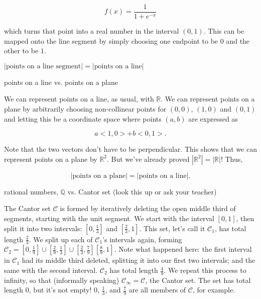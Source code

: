 \documentclass[../key.tex]{subfiles}
\begin{document}
$$f(x)=\frac{1}{1+e^{-x}}$$

\noindent which turns that point into a real number in the interval $(0,1)$. This can be mapped onto the line segment by simply choosing one endpoint to be $0$ and the other to be $1$.

$|\text{points on a line segment}| = |\text{points on a line}|$

\begin{inner_problem}
\item points on a line vs. points on a plane
\end{inner_problem}

\noindent We can represent points on a line, as usual, with $\mathbb{R}$. We can represent points on a plane by arbitrarily choosing non-collinear points for $(0,0)$, $(1,0)$ and $(0,1)$ and letting this be a coordinate space where points $(a,b)$ are expressed as

$$a<1,0>+b<0,1>.$$

\noindent Note that the two vectors don't have to be perpendicular. This shows that we can represent points on a plane by $\mathbb{R}^2$. But we've already proved $\left|\mathbb{R}^2\right| = |\mathbb{R}|$! Thus,

$$\left|\text{points on a plane}\right| = \left|\text{points on a line}\right|.$$

\begin{inner_problem}
\item rational numbers, $\mathbb{Q}$ vs. Cantor set (look this up or ask your teacher)
\end{inner_problem}

\noindent The Cantor set $\mathcal{C}$ is formed by iteratively deleting the open middle third of segments, starting with the unit segment. We start with the interval $[0,1]$, then split it into two intervals: $\left[0, \frac{1}{3}\right]$ and $\left[\frac{2}{3}, 1\right]$. This set, let's call it $\mathcal{C}_1$, has total length $\frac{2}{3}$. We split up each of $\mathcal{C}_1$'s intervals again, forming $\mathcal{C}_2=\left[0,
\frac{1}{9}\right]\cup\left[\frac{2}{9},\frac{1}{3}\right]\cup\left[\frac{2}{3},\frac{7}{9}\right]\left[\frac{8}{9},1\right]$. Note what happened here: the first interval in $\mathcal{C}_1$ had its middle third deleted, splitting it into our first two intervals; and the same with the second interval. $\mathcal{C}_2$ has total length $\frac{4}{9}$. We repeat this process to infinity, so that (informally speaking) $\mathcal{C}_{\infty} = \mathcal{C}$, the Cantor set. The set has total
length $0$, but it's not empty! $0$, $\frac{1}{3}$, and $\frac{7}{9}$ are all members of $\mathcal{C}$, for example. 
\end{document}
